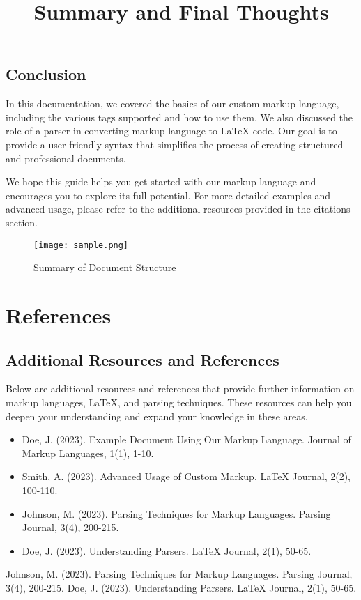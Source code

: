 \documentclass[oneside]{book}
\begin{document}
\newpage
\section{Conclusion}
\title{Summary and Final Thoughts}
In this documentation, we covered the basics of our custom markup language, including the various tags supported and how to use them. We also discussed the role of a parser in converting markup language to LaTeX code. Our goal is to provide a user-friendly syntax that simplifies the process of creating structured and professional documents.\par
We hope this guide helps you get started with our markup language and encourages you to explore its full potential. For more detailed examples and advanced usage, please refer to the additional resources provided in the citations section.\par
\begin{figure}[h]
\centering
\texttt{[image: sample.png]}
\caption{Summary of Document Structure}
\end{figure}
\newpage
\chapter{References}
\section{Additional Resources and References}
Below are additional resources and references that provide further information on markup languages, LaTeX, and parsing techniques. These resources can help you deepen your understanding and expand your knowledge in these areas.\par
\begin{itemize}
\item Doe, J. (2023). Example Document Using Our Markup Language. Journal of Markup Languages, 1(1), 1-10.
\item Smith, A. (2023). Advanced Usage of Custom Markup. LaTeX Journal, 2(2), 100-110.
\item Johnson, M. (2023). Parsing Techniques for Markup Languages. Parsing Journal, 3(4), 200-215.
\item Doe, J. (2023). Understanding Parsers. LaTeX Journal, 2(1), 50-65.
\end{itemize}
\begin{thebibliography}{100}
Johnson, M. (2023). Parsing Techniques for Markup Languages. Parsing Journal, 3(4), 200-215.
Doe, J. (2023). Understanding Parsers. LaTeX Journal, 2(1), 50-65.
\end{thebibliography}
\end{document}
